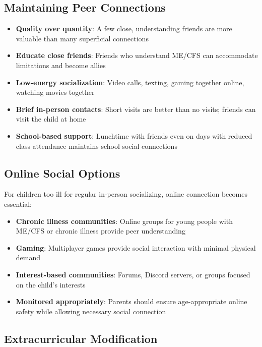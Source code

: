\subsection{Maintaining Peer Connections}

\begin{itemize}
    \item \textbf{Quality over quantity}: A few close, understanding friends are more valuable than many superficial connections
    \item \textbf{Educate close friends}: Friends who understand ME/CFS can accommodate limitations and become allies
    \item \textbf{Low-energy socialization}: Video calls, texting, gaming together online, watching movies together
    \item \textbf{Brief in-person contacts}: Short visits are better than no visits; friends can visit the child at home
    \item \textbf{School-based support}: Lunchtime with friends even on days with reduced class attendance maintains school social connections
\end{itemize}

\subsection{Online Social Options}

For children too ill for regular in-person socializing, online connection becomes essential:

\begin{itemize}
    \item \textbf{Chronic illness communities}: Online groups for young people with ME/CFS or chronic illness provide peer understanding
    \item \textbf{Gaming}: Multiplayer games provide social interaction with minimal physical demand
    \item \textbf{Interest-based communities}: Forums, Discord servers, or groups focused on the child's interests
    \item \textbf{Monitored appropriately}: Parents should ensure age-appropriate online safety while allowing necessary social connection
\end{itemize}

\subsection{Extracurricular Modification}

